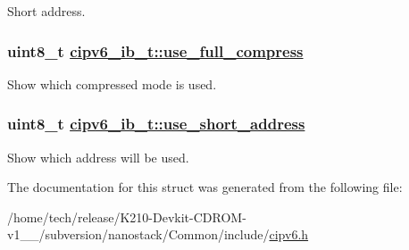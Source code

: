 Short address. \hypertarget{structcipv6__ib__t_f4b81848abaa43f3c7ae7ade198551d9}{
\subsubsection[use\_\-full\_\-compress]{\setlength{\rightskip}{0pt plus 5cm}uint8\_\-t \hyperlink{structcipv6__ib__t_f4b81848abaa43f3c7ae7ade198551d9}{cipv6\_\-ib\_\-t::use\_\-full\_\-compress}}}
\label{structcipv6__ib__t_f4b81848abaa43f3c7ae7ade198551d9}


Show which compressed mode is used. \hypertarget{structcipv6__ib__t_d05d62d4e95b0a7ea7a9ee993b506cde}{
\subsubsection[use\_\-short\_\-address]{\setlength{\rightskip}{0pt plus 5cm}uint8\_\-t \hyperlink{structcipv6__ib__t_d05d62d4e95b0a7ea7a9ee993b506cde}{cipv6\_\-ib\_\-t::use\_\-short\_\-address}}}
\label{structcipv6__ib__t_d05d62d4e95b0a7ea7a9ee993b506cde}


Show which address will be used. 

The documentation for this struct was generated from the following file:\begin{CompactItemize}
\item 
/home/tech/release/K210-Devkit-CDROM-v1\_\_/subversion/nanostack/Common/include/\hyperlink{cipv6_8h}{cipv6.h}\end{CompactItemize}
